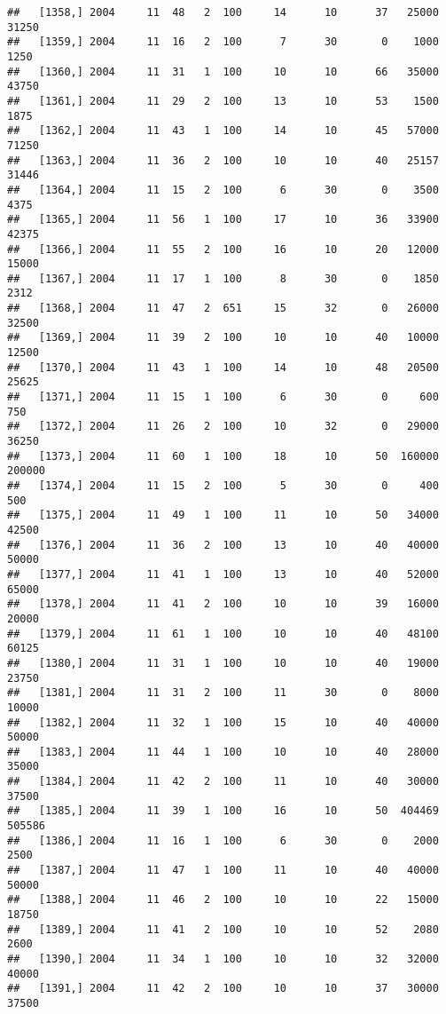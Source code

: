 \documentclass{article}\usepackage[]{graphicx}\usepackage[]{color}
\makeatletter
\newenvironment{kframe}{%
 \def\at@end@of@kframe{}%
 \ifinner\ifhmode%
  \def\at@end@of@kframe{\end{minipage}}%
  \begin{minipage}{\columnwidth}%
 \fi\fi%
 \def\FrameCommand##1{\hskip\@totalleftmargin \hskip-\fboxsep
 \colorbox{shadecolor}{##1}\hskip-\fboxsep
     \hskip-\linewidth \hskip-\@totalleftmargin \hskip\columnwidth}%
 \MakeFramed {\advance\hsize-\width
   \@totalleftmargin\z@ \linewidth\hsize
   \@setminipage}}%
 {\par\unskip\endMakeFramed%
 \at@end@of@kframe}
\newenvironment{knitrout}{}{} %
\makeatother
\begin{document}
\begin{knitrout}
\begin{kframe}
\begin{verbatim}
##   [1358,] 2004     11  48   2  100     14      10      37   25000   31250
##   [1359,] 2004     11  16   2  100      7      30       0    1000    1250
##   [1360,] 2004     11  31   1  100     10      10      66   35000   43750
##   [1361,] 2004     11  29   2  100     13      10      53    1500    1875
##   [1362,] 2004     11  43   1  100     14      10      45   57000   71250
##   [1363,] 2004     11  36   2  100     10      10      40   25157   31446
##   [1364,] 2004     11  15   2  100      6      30       0    3500    4375
##   [1365,] 2004     11  56   1  100     17      10      36   33900   42375
##   [1366,] 2004     11  55   2  100     16      10      20   12000   15000
##   [1367,] 2004     11  17   1  100      8      30       0    1850    2312
##   [1368,] 2004     11  47   2  651     15      32       0   26000   32500
##   [1369,] 2004     11  39   2  100     10      10      40   10000   12500
##   [1370,] 2004     11  43   1  100     14      10      48   20500   25625
##   [1371,] 2004     11  15   1  100      6      30       0     600     750
##   [1372,] 2004     11  26   2  100     10      32       0   29000   36250
##   [1373,] 2004     11  60   1  100     18      10      50  160000  200000
##   [1374,] 2004     11  15   2  100      5      30       0     400     500
##   [1375,] 2004     11  49   1  100     11      10      50   34000   42500
##   [1376,] 2004     11  36   2  100     13      10      40   40000   50000
##   [1377,] 2004     11  41   1  100     13      10      40   52000   65000
##   [1378,] 2004     11  41   2  100     10      10      39   16000   20000
##   [1379,] 2004     11  61   1  100     10      10      40   48100   60125
##   [1380,] 2004     11  31   1  100     10      10      40   19000   23750
##   [1381,] 2004     11  31   2  100     11      30       0    8000   10000
##   [1382,] 2004     11  32   1  100     15      10      40   40000   50000
##   [1383,] 2004     11  44   1  100     10      10      40   28000   35000
##   [1384,] 2004     11  42   2  100     11      10      40   30000   37500
##   [1385,] 2004     11  39   1  100     16      10      50  404469  505586
##   [1386,] 2004     11  16   1  100      6      30       0    2000    2500
##   [1387,] 2004     11  47   1  100     11      10      40   40000   50000
##   [1388,] 2004     11  46   2  100     10      10      22   15000   18750
##   [1389,] 2004     11  41   2  100     10      10      52    2080    2600
##   [1390,] 2004     11  34   1  100     10      10      32   32000   40000
##   [1391,] 2004     11  42   2  100     10      10      37   30000   37500

\end{verbatim}
\end{kframe}
\end{knitrout}
\end{document}
